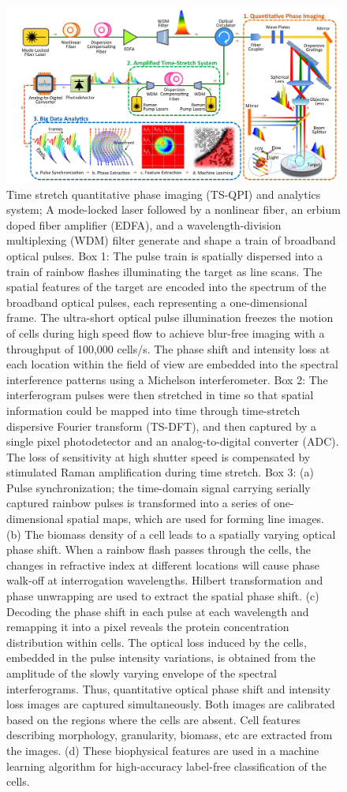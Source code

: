 \documentclass[aps,pra,reprint,superscriptaddress]{revtex4-1}
\begin{document}
\begin{figure}
\includegraphics[scale=0.2]{FigureSetup.jpg}
\caption{\label{fig:Setup} Time stretch quantitative phase imaging (TS-QPI) and analytics system; A mode-locked laser followed by a nonlinear fiber, an erbium doped fiber amplifier (EDFA), and a wavelength-division multiplexing (WDM) filter generate and shape a train of broadband optical pulses. Box 1: The pulse train is spatially dispersed into a train of rainbow flashes illuminating the target as line scans. The spatial features of the target are encoded into the spectrum of the broadband optical pulses, each representing a one-dimensional frame. The ultra-short optical pulse illumination freezes the motion of cells during high speed flow to achieve blur-free imaging with a throughput of 100,000 cells/s. The phase shift and intensity loss at each location within the field of view are embedded into the spectral interference patterns using a Michelson interferometer. Box 2: The interferogram pulses were then stretched in time so that spatial information could be mapped into time through time-stretch dispersive Fourier transform (TS-DFT), and then captured by a single pixel photodetector and an analog-to-digital converter (ADC). The loss of sensitivity at high shutter speed is compensated by stimulated Raman amplification during time stretch. Box 3: (a) Pulse synchronization; the time-domain signal carrying serially captured rainbow pulses is transformed into a series of one-dimensional spatial maps, which are used for forming line images. (b) The biomass density of a cell leads to a spatially varying optical phase shift. When a rainbow flash passes through the cells, the changes in refractive index at different locations will cause phase walk-off at interrogation wavelengths. Hilbert transformation and phase unwrapping are used to extract the spatial phase shift. (c) Decoding the phase shift in each pulse at each wavelength and remapping it into a pixel reveals the protein concentration distribution within cells. The optical loss induced by the cells, embedded in the pulse intensity variations, is obtained from the amplitude of the slowly varying envelope of the spectral interferograms. Thus, quantitative optical phase shift and intensity loss images are captured simultaneously. Both images are calibrated based on the regions where the cells are absent. Cell features describing morphology, granularity, biomass, etc are extracted from the images. (d) These biophysical features are used in a machine learning algorithm for high-accuracy label-free classification of the cells.}
\end{figure}
\end{document}
